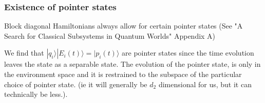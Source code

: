 \documentclass{article}
\begin{document}
\subsubsection{Existence of pointer states}
Block diagonal Hamiltonians always allow for certain pointer states (See "A Search for Classical Subsystems in Quantum Worlds" Appendix A)\\


\begin{comment}
(Question, could we find one who's entanglement is not zero, but stays constant??? is it the case for a superposition of pointer states here? pointer stats on diff qi's??)
Thinking about it, that would be a state such that the off diagonal terms are non-zero and dont really vary in time.
or a state that cant be written as a separable pure state (ie superposition of 2 such state for ex) but where the relative weights of the 2 separable states stay the same. I think we can essentially express entanglement as a function of the relative weight of the 2 Schmidt states. if one dominates, then low entanglement, if they share weights pretty well then high entrop.
\end{comment}
We find that $|q_i\rangle|E_i(t)\rangle = |p_i(t)\rangle$ are pointer states since the time evolution leaves the state as a separable state. The evolution of the pointer state, is only in the environment space and it is restrained to the subspace of the particular choice of pointer state. (ie it will generally be $d_2$ dimensional for us, but it can technically be less.).

\begin{comment}
    $H_{tot}$ is block diagonal. This affords it some nice properties. Notably that its eigenstates can be written as $\{|q_i\rangle|j\rangle\}=\{|i\rangle_w\}\forall i\leq d_1,j\leq d_2$. We then get to re-write it,
\begin{equation}
    H_{tot}=\sum_k|q_k\rangle \langle q_k|\otimes\sum_lE_{kl}|l\rangle\langle l| = \sum_k|q_k\rangle \langle q_k|\otimes H^{(k)}_t
\end{equation}

Diagonalize $H_{tot}=W^{\dagger}DW$ with $D=\sum_i\lambda_i|i\rangle_w \langle i|_w$, with the $\lambda_{i}$ the eigenvalues of $H_{tot}$. Then, any state defined by $E|q_i\rangle|E_i\rangle$ for $|E_i\rangle$ any state defined on the environemnt, is a pointer state.
To see this, evolve it in time by ,
\begin{align*}
    W^{\dagger}e^{-itH_{tot}}W|q_i\rangle|\psi_e\rangle = W^{\dagger}We^{-itD}W^{\dagger}W|q_i\rangle|\psi_e\rangle \\
    = |q_i\rangle e^{-itH^{(i)}_e}|\psi_e\rangle \\
    = |q_i\rangle|\psi_e(t)\rangle
\end{align*}
\end{comment}
\end{document}

